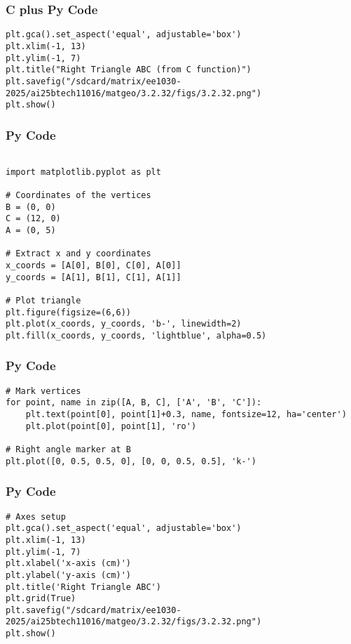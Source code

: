 \documentclass{beamer}
\begin{document}
\begin{frame}[fragile]
    \frametitle{C plus Py Code}
\begin{lstlisting}
plt.gca().set_aspect('equal', adjustable='box')
plt.xlim(-1, 13)
plt.ylim(-1, 7)
plt.title("Right Triangle ABC (from C function)")
plt.savefig("/sdcard/matrix/ee1030-2025/ai25btech11016/matgeo/3.2.32/figs/3.2.32.png")
plt.show()
\end{lstlisting}
\end{frame}
\begin{frame}[fragile]
    \frametitle{Py Code}
\begin{lstlisting}

import matplotlib.pyplot as plt

# Coordinates of the vertices
B = (0, 0)
C = (12, 0)
A = (0, 5)

# Extract x and y coordinates
x_coords = [A[0], B[0], C[0], A[0]]
y_coords = [A[1], B[1], C[1], A[1]]

# Plot triangle
plt.figure(figsize=(6,6))
plt.plot(x_coords, y_coords, 'b-', linewidth=2)
plt.fill(x_coords, y_coords, 'lightblue', alpha=0.5)
\end{lstlisting}
\end{frame}
\begin{frame}[fragile]
    \frametitle{Py Code}
\begin{lstlisting}
# Mark vertices
for point, name in zip([A, B, C], ['A', 'B', 'C']):
    plt.text(point[0], point[1]+0.3, name, fontsize=12, ha='center')
    plt.plot(point[0], point[1], 'ro')

# Right angle marker at B
plt.plot([0, 0.5, 0.5, 0], [0, 0, 0.5, 0.5], 'k-')
\end{lstlisting}
\end{frame}
\begin{frame}[fragile]
    \frametitle{Py Code}
\begin{lstlisting}
# Axes setup
plt.gca().set_aspect('equal', adjustable='box')
plt.xlim(-1, 13)
plt.ylim(-1, 7)
plt.xlabel('x-axis (cm)')
plt.ylabel('y-axis (cm)')
plt.title('Right Triangle ABC')
plt.grid(True)
plt.savefig("/sdcard/matrix/ee1030-2025/ai25btech11016/matgeo/3.2.32/figs/3.2.32.png")
plt.show()
\end{lstlisting}
\end{frame}
\end{document}
